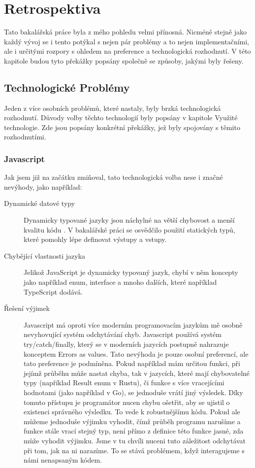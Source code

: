 \chapter{Retrospektiva}

Tato bakalářská práce byla z mého pohledu velmi přínosná. Nicméně stejně jako každý vývoj se i tento potýkal s nejen pár problémy a to nejen implementačními, ale i určitými rozpory s ohledem na preference a technologická rozhodnutí. V této kapitole budou tyto překážky popsány společně se způsoby, jakými byly řešeny.

\section{Technologické Problémy}

Jeden z více osobních problémů, které nastaly, byly brzká technologická rozhodnutí. Důvody volby těchto technologií byly popsány v kapitole Využité technologie. Zde jsou popsány konkrétní překážky, jež byly spojovány s těmito rozhodnutími.

\subsection{Javascript}
Jak jsem již na začátku zmiňoval, tato technologická volba nese i značné nevýhody, jako například:

\begin{description}
\item[Dynamické datové typy] 
Dynamicky typované jazyky jsou náchylné na větší chybovost a menší kvalitu kódu \cite{pang2018programming}. V bakalářské práci se osvědčilo použití statických typů, které pomohly lépe definovat výstupy a vstupy.
\item[Chybějící vlastnosti jazyka] 
Jelikož JavaScript je dynamicky typovaný jazyk, chybí v něm koncepty jako například enum, interface a mnoho dalších, které například TypeScript dodává.
\item[Řešení výjimek]
Javascript má oproti více moderním programovacím jazykům mě osobně nevyhovující systém odchytávání chyb. Javascript používá systém try/catch/finally, který se v moderních jazycích postupně nahrazuje konceptem Errors as values. Tato nevýhoda je pouze osobní preferencí, ale tato preference je podmíněna. Pokud například mám určitou funkci, při jejímž průběhu může nastat chyba, tak v jazycích, které mají chybovatelné typy (například Result enum v Rustu), či funkce s více vracejícími hodnotami (jako například v Go), se jednoduše vrátí jiný výsledek. Díky tomuto přístupu je programátor nucen chybu ošetřit, aby se ujistil o existenci správného výsledku. To vede k robustnějšímu kódu. Pokud ale můžeme jednoduše výjimku vyhodit, čímž průběh programu narušíme a funkce stále vrací stejný typ, není přímo z definice této funkce jasné, zda může vyhodit výjimku. Jsme v tu chvíli nuceni tuto záležitost odchytávat při tom, jak na ni narazíme. To se stává problémem, když interagujeme s námi nenapsaným kódem.
\end{description}

